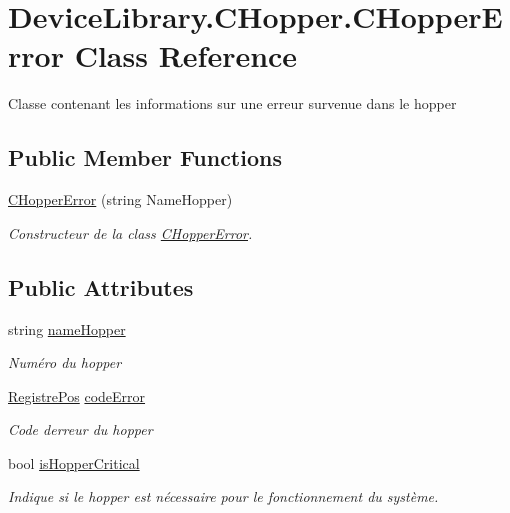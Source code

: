 \hypertarget{class_device_library_1_1_c_hopper_1_1_c_hopper_error}{}\section{Device\+Library.\+C\+Hopper.\+C\+Hopper\+Error Class Reference}
\label{class_device_library_1_1_c_hopper_1_1_c_hopper_error}


Classe contenant les informations sur une erreur survenue dans le hopper  


\subsection*{Public Member Functions}
\begin{DoxyCompactItemize}
\item 
\mbox{\hyperlink{class_device_library_1_1_c_hopper_1_1_c_hopper_error_a0603880c146f9101b3a4b94b817eba09}{C\+Hopper\+Error}} (string Name\+Hopper)
\begin{DoxyCompactList}\small\item\em Constructeur de la class \mbox{\hyperlink{class_device_library_1_1_c_hopper_1_1_c_hopper_error}{C\+Hopper\+Error}}. \end{DoxyCompactList}\end{DoxyCompactItemize}
\subsection*{Public Attributes}
\begin{DoxyCompactItemize}
\item 
string \mbox{\hyperlink{class_device_library_1_1_c_hopper_1_1_c_hopper_error_a0b9f9b66126ab5bb7d8fab1cb6a74370}{name\+Hopper}}
\begin{DoxyCompactList}\small\item\em Numéro du hopper \end{DoxyCompactList}\item 
\mbox{\hyperlink{class_device_library_1_1_c_hopper_afce8f2089a688f1d3fdf9db91242fb01}{Registre\+Pos}} \mbox{\hyperlink{class_device_library_1_1_c_hopper_1_1_c_hopper_error_a90797e7b2066041378d0febf2e3337d5}{code\+Error}}
\begin{DoxyCompactList}\small\item\em Code d\textquotesingle{}erreur du hopper \end{DoxyCompactList}\item 
bool \mbox{\hyperlink{class_device_library_1_1_c_hopper_1_1_c_hopper_error_a3807ac7aa4c86af85a302c53d4c515de}{is\+Hopper\+Critical}}
\begin{DoxyCompactList}\small\item\em Indique si le hopper est nécessaire pour le fonctionnement du système. \end{DoxyCompactList}\end{DoxyCompactItemize}


